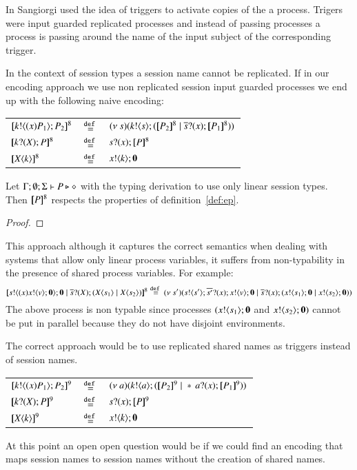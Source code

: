 In \cite{} Sangiorgi used the idea of triggers to activate
copies of the a process. Trigers were input guarded replicated
processes and instead of passing processes a process is
passing around the name of the input subject of the corresponding trigger.

In the context of session types a session name cannot be replicated.
If in our encoding approach we use non replicated session input guarded
processes we end up with the following naive encoding:

\begin{definition}

	\begin{tabular}{lcl}
		$[\!\![k ! \langle (x)P_1 \rangle ; P_2]\!\!]^{8}$ &$\stackrel{\mathtt{def}\ }{=}$& $ \newsp{s}{\bout{k}{s} (\map{P_2}^8 \Par \binp{\dual{s}}{x} \map{P_1}^8)} $\\
		$[\!\![k ? (X) ; P]\!\!]^{8}$ &$\stackrel{\mathtt{def}\ }{=}$& $s ? (x) ; [\!\![P]\!\!]^8$\\
		$[\!\![X\langle k \rangle]\!\!]^8$ &$\stackrel{\mathtt{def}\ }{=}$& $x ! \langle k \rangle ; \mathbf{0}$
	\end{tabular}
\end{definition}

\begin{proposition}
	Let $\Gamma;\emptyset;\Sigma \vdash P \triangleright \diamond$ with
	the typing derivation to use only linear session types. Then
	$[\!\![P]\!\!]^8$ respects the properties of definition~\ref{def:ep}.
\end{proposition}

\begin{proof}
\end{proof}

This approach although it captures the correct semantics when
dealing with systems that allow only linear process variables,
it suffers from non-typability in the presence
of shared process variables. For example:
\[
	[\!\![s ! \langle (x)x ! \langle v \rangle ;\mathbf{0} \rangle ; \mathbf{0} \;|\; \overline{s} ? (X) ; (X\langle s_1 \rangle \;|\; X\langle s_2 \rangle)]\!\!]^8 \stackrel{\mathtt{def}\ }{=}
	(\nu\ s')(s ! \langle s' \rangle ; \overline{s'} ? (x) ; x ! \langle v \rangle ; \mathbf{0} \;|\; \overline{s} ? (x) ; (x ! \langle s_1 \rangle ; \mathbf{0} \;|\; x ! \langle s_2 \rangle ; \mathbf{0}))
\]
The above process is non typable since processes $(x ! \langle s_1 \rangle ; \mathbf{0}$ and $x ! \langle s_2 \rangle ; \mathbf{0})$
cannot be put in parallel because they do not have disjoint environments.

The correct approach would be to use replicated shared names
as triggers instead of session names. 

\begin{definition}

	\begin{tabular}{lcl}
		$[\!\![k ! \langle (x)P_1 \rangle ; P_2]\!\!]^{9}$ &$\stackrel{\mathtt{def}\ }{=}$& $ \newsp{a}{\bout{k}{a} (\map{P_2}^9 \Par \repl{} \binp{a}{x}  \map{P_1}^9)} $\\
		$[\!\![k ? (X) ; P]\!\!]^{9}$ &$\stackrel{\mathtt{def}\ }{=}$& $s ? (x) ; [\!\![P]\!\!]^9$\\
		$[\!\![X\langle k \rangle]\!\!]^9$ &$\stackrel{\mathtt{def}\ }{=}$& $x ! \langle k \rangle ; \mathbf{0}$
	\end{tabular}
\end{definition}

At this point an open open question would be if
we could find an encoding that maps
session names to session names without the creation
of shared names.



